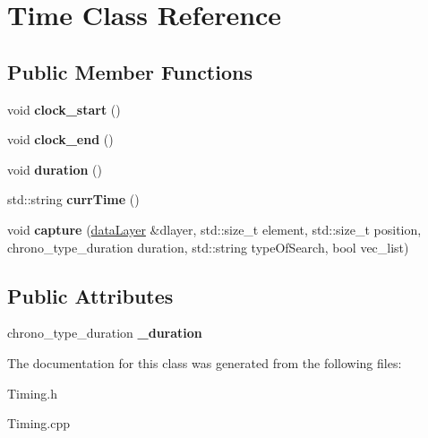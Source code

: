 \hypertarget{class_time}{}\section{Time Class Reference}
\label{class_time}
\subsection*{Public Member Functions}
\begin{DoxyCompactItemize}
\item 
\hypertarget{class_time_a3c7c3badb3421de0768a5e2a7bf5a997}{}void {\bfseries clock\+\_\+start} ()\label{class_time_a3c7c3badb3421de0768a5e2a7bf5a997}

\item 
\hypertarget{class_time_a1853fc1d1c2762c9656001652efab021}{}void {\bfseries clock\+\_\+end} ()\label{class_time_a1853fc1d1c2762c9656001652efab021}

\item 
\hypertarget{class_time_a30818f8bf0fb9912bbaf4e0d9d23be8d}{}void {\bfseries duration} ()\label{class_time_a30818f8bf0fb9912bbaf4e0d9d23be8d}

\item 
\hypertarget{class_time_a194bad48b2cf89e8b2951b27286769d4}{}std\+::string {\bfseries curr\+Time} ()\label{class_time_a194bad48b2cf89e8b2951b27286769d4}

\item 
\hypertarget{class_time_aaa898775acdc73c82b77569ec5cbe19d}{}void {\bfseries capture} (\hyperlink{classdata_layer}{data\+Layer} \&dlayer, std\+::size\+\_\+t element, std\+::size\+\_\+t position, chrono\+\_\+type\+\_\+duration duration, std\+::string type\+Of\+Search, bool vec\+\_\+list)\label{class_time_aaa898775acdc73c82b77569ec5cbe19d}

\end{DoxyCompactItemize}
\subsection*{Public Attributes}
\begin{DoxyCompactItemize}
\item 
\hypertarget{class_time_a683c5aca746bce8fb1da04f380b75893}{}chrono\+\_\+type\+\_\+duration {\bfseries \+\_\+duration}\label{class_time_a683c5aca746bce8fb1da04f380b75893}

\end{DoxyCompactItemize}


The documentation for this class was generated from the following files\+:\begin{DoxyCompactItemize}
\item 
Timing.\+h\item 
Timing.\+cpp\end{DoxyCompactItemize}
